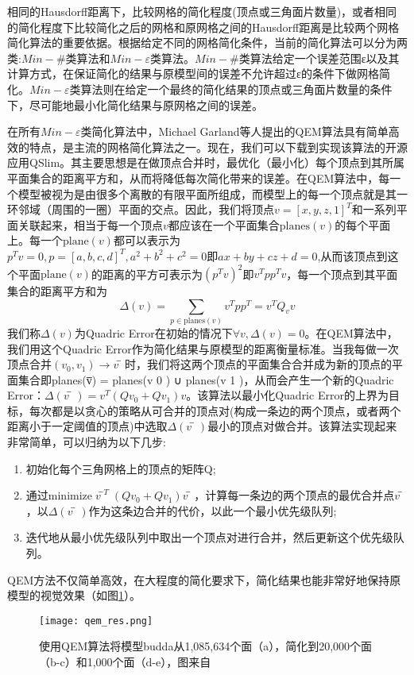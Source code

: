 相同的Hausdorff距离下，比较网格的简化程度(顶点或三角面片数量)，或者相同的简化程度下比较简化之后的网格和原网格之间的Hausdorff距离是比较两个网格简化算法的重要依据。根据给定不同的网格简化条件，当前的简化算法可以分为两类:$Min−\#$类算法和$Min−\varepsilon$类算法\cite{simp-envlop}。$Min−\#$类算法给定一个误差范围ε以及其计算方式，在保证简化的结果与原模型间的误差不允许超过ε的条件下做网格简化。$Min−\varepsilon$类算法则在给定一个最终的简化结果的顶点或三角面片数量的条件下，尽可能地最小化简化结果与原网格之间的误差。\par

在所有$Min−\varepsilon$类简化算法中，Michael Garland等人提出的QEM算法\cite{qem1}具有简单高效的特点，是主流的网格简化算法之一。现在，我们可以下载到实现该算法的开源应用QSlim。其主要思想是在做顶点合并时，最优化（最小化）每个顶点到其所属平面集合的距离平方和，从而将降低每次简化带来的误差。在QEM算法中，每一个模型被视为是由很多个离散的有限平面所组成，而模型上的每一个顶点就是其一环邻域（周围的一圈）平面的交点。因此，我们将顶点$v=[x,y,z,1]^T$和一系列平面关联起来，相当于每一个顶点$v$都应该在一个平面集合$\text{planes}(v)$的每个平面上。每一个$\text{plane}(v)$都可以表示为$p^Tv=0,p=[a,b,c,d]^T,a^2+b^2+c^2=0即ax+by+cz+d=0$,从而该顶点到这个平面$\text{plane}(v)$的距离的平方可表示为$(p^Tv)^2$即$v^Tpp^Tv$，每一个顶点到其平面集合的距离平方和为
\begin{equation}
  \Delta(v) = \sum_{p\in \text{planes}(v)}v^Tpp^T = v^TQ_vv
\end{equation}
我们称$\Delta(v)$为Quadric Error在初始的情况下$\forall v,\Delta(v)=0$。在QEM算法中，我们用这个Quadric
Error作为简化结果与原模型的距离衡量标准。当我每做一次顶点合并$(v_0, v_1) \to v̅$时，我们将这两个顶点的平面集合合并成为新的顶点的平面集合即planes(v̅) = planes(v 0 ) ∪ planes(v 1 )，从而会产生一个新的Quadric Error：$\Delta(v̅)=v^T(Qv_0+Qv_1)v$。该算法以最小化Quadric Error的上界为目标，每次都是以贪心的策略从可合并的顶点对(构成一条边的两个顶点，或者两个距离小于一定阈值的顶点)中选取$\Delta(v̅)$最小的顶点对做合并。该算法实现起来非常简单，可以归纳为以下几步:
\begin{enumerate}[（1）]
  \item 初始化每个三角网格上的顶点的矩阵Q;
  \item 通过$\text{minimize} \; v̅^T(Qv_0+Qv_1)v̅$，计算每一条边的两个顶点的最优合并点$v̅$ ，以$\Delta(v̅)$作为这条边合并的代价，以此一个最小优先级队列;
  \item 迭代地从最小优先级队列中取出一个顶点对进行合并，然后更新这个优先级队列。
\end{enumerate}
QEM方法不仅简单高效，在大程度的简化要求下，简化结果也能非常好地保持原模型的视觉效果（如图\ref{fig:qem-res}）。
\begin{figure}[htbp]
    \centering
    \texttt{[image: qem\_res.png]}
    \caption[QEM算法结果]{使用QEM算法将模型budda从1,085,634个面（a），简化到20,000个面（b-c）和1,000个面（d-e），图来自\cite{qem2}}
    \label{fig:qem-res}
\end{figure}

